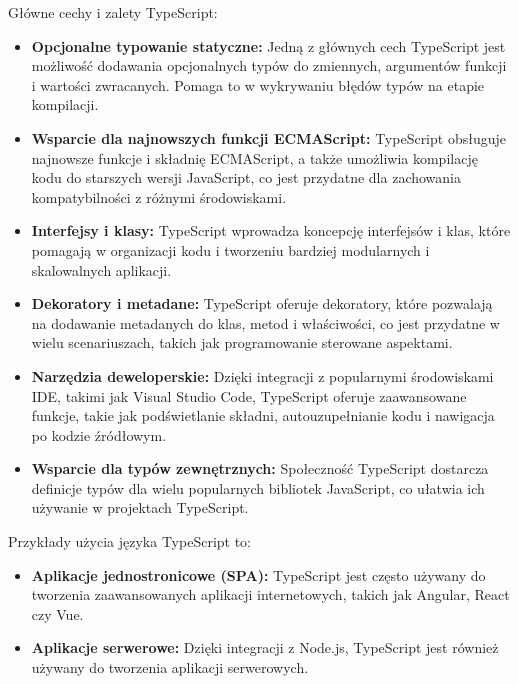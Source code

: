 Główne cechy i zalety TypeScript:
\begin{itemize}
\item \textbf{Opcjonalne typowanie statyczne:} Jedną z głównych cech TypeScript jest możliwość dodawania opcjonalnych typów do zmiennych, argumentów funkcji i wartości zwracanych. Pomaga to w wykrywaniu błędów typów na etapie kompilacji.

\item \textbf{Wsparcie dla najnowszych funkcji ECMAScript:} TypeScript obsługuje najnowsze funkcje i składnię ECMAScript, a także umożliwia kompilację kodu do starszych wersji JavaScript, co jest przydatne dla zachowania kompatybilności z różnymi środowiskami.

\item \textbf{Interfejsy i klasy:} TypeScript wprowadza koncepcję interfejsów i klas, które pomagają w organizacji kodu i tworzeniu bardziej modularnych i skalowalnych aplikacji.

\item \textbf{Dekoratory i metadane:} TypeScript oferuje dekoratory, które pozwalają na dodawanie metadanych do klas, metod i właściwości, co jest przydatne w wielu scenariuszach, takich jak programowanie sterowane aspektami.

\item \textbf{Narzędzia deweloperskie:} Dzięki integracji z popularnymi środowiskami IDE, takimi jak Visual Studio Code, TypeScript oferuje zaawansowane funkcje, takie jak podświetlanie składni, autouzupełnianie kodu i nawigacja po kodzie źródłowym.

\item \textbf{Wsparcie dla typów zewnętrznych:} Społeczność TypeScript dostarcza definicje typów dla wielu popularnych bibliotek JavaScript, co ułatwia ich używanie w projektach TypeScript.
\end{itemize}

Przykłady użycia języka TypeScript to:

\begin{itemize}
\item \textbf{Aplikacje jednostronicowe (SPA):} TypeScript jest często używany do tworzenia zaawansowanych aplikacji internetowych, takich jak Angular, React czy Vue.

\item \textbf{Aplikacje serwerowe:} Dzięki integracji z Node.js, TypeScript jest również używany do tworzenia aplikacji serwerowych.
\end{itemize}

